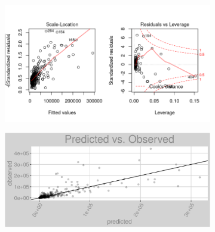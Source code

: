 \begin{figure}[h]
\centering
\begin{subfigure}{1\textwidth}
\centering
\includegraphics[width=.99\textwidth, height=0.475\textheight]{Images/district_heat_lp_res_2.png}
\end{subfigure}
\begin{subfigure}{1\textwidth}
\centering
\includegraphics[width=.99\textwidth, height=0.3\textheight]{Images/district_heat_lp_pvo.png}
\end{subfigure}
\end{figure}
\FloatBarrier
\newpage
